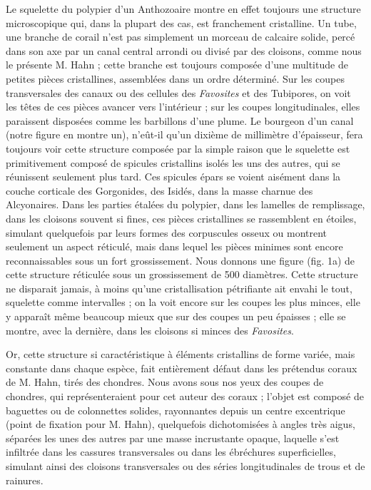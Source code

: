 \documentclass[a4paper, 12pt, oneside, french]{article}
\begin{document}
Le squelette du polypier d'un Anthozoaire montre en effet toujours une structure microscopique qui, dans la plupart des cas, est franchement cristalline. Un tube, une branche de corail n'est pas simplement un morceau de calcaire solide, percé dans son axe par un canal central arrondi ou divisé par des cloisons, comme nous le présente M. Hahn ; cette branche est toujours composée d'une multitude de petites pièces cristallines, assemblées dans un ordre déterminé. Sur les coupes transversales des canaux ou des cellules des \emph{Favosites} et des Tubipores, on voit les têtes de ces pièces avancer vers l'intérieur ; sur les coupes longitudinales, elles paraissent disposées comme les barbillons d'une plume. Le bourgeon d'un canal (notre figure en montre un), n'eût-il qu'un dixième de millimètre d'épaisseur, fera toujours voir cette structure composée par la simple raison que le squelette est primitivement composé de spicules cristallins isolés les uns des autres, qui se réunissent seulement plus tard. Ces spicules épars se voient aisément dans la couche corticale des Gorgonides, des Isidés, dans la masse charnue des Alcyonaires. Dans les parties étalées du polypier, dans les lamelles de remplissage, dans les cloisons souvent si fines, ces pièces cristallines se rassemblent en étoiles, simulant quelquefois par leurs formes des corpuscules osseux ou montrent seulement un aspect réticulé, mais dans lequel les pièces minimes sont encore reconnaissables sous un fort grossissement. Nous donnons une figure (fig. 1a) de cette structure réticulée sous un grossissement de 500 diamètres. Cette structure ne disparait jamais, à moins qu'une cristallisation pétrifiante ait envahi le tout, squelette comme intervalles ; on la voit encore sur les coupes les plus minces, elle y apparaît même beaucoup mieux que sur des coupes un peu épaisses ; elle se montre, avec la dernière, dans les cloisons si minces des \emph{Favosites}.

Or, cette structure si caractéristique à éléments cristallins de forme variée, mais constante dans chaque espèce, fait entièrement défaut dans les prétendus coraux de M. Hahn, tirés des chondres. Nous avons sous nos yeux des coupes de chondres, qui représenteraient pour cet auteur des coraux ; l'objet est composé de baguettes ou de colonnettes solides, rayonnantes depuis un centre excentrique (point de fixation pour M. Hahn), quelquefois dichotomisées à angles très aigus, séparées les unes des autres par une masse incrustante opaque, laquelle s'est infiltrée dans les cassures transversales ou dans les ébréchures superficielles, simulant ainsi des cloisons transversales ou des séries longitudinales de trous et de rainures.
\end{document}
